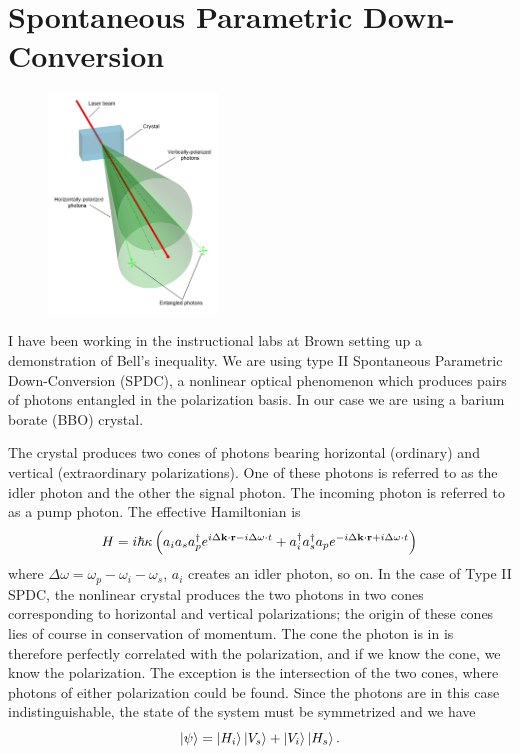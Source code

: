 \documentclass{report}
\begin{document}
\section{Spontaneous Parametric Down-Conversion}
\begin{figure}
	\begin{center}
		\includegraphics[width=0.4\textwidth]{figs/september/350px-SPDC_figure.png}
		\caption{}
		\label{fig:spdc}
	\end{center}
	\vspace*{-4em}
\end{figure}

I have been working in the instructional labs at Brown setting up a demonstration 
of Bell's inequality. We are using type II Spontaneous Parametric
Down-Conversion (SPDC), a nonlinear optical phenomenon which produces pairs of photons
entangled in the polarization basis. In our case we are using a barium borate
(BBO) crystal. 

The crystal produces two cones of photons bearing horizontal (ordinary) and 
vertical (extraordinary polarizations). One of these photons is referred to as 
the idler photon and the other the signal photon. The incoming photon is 
referred to as a pump photon. The effective Hamiltonian is 
\begin{equation*}
	H = i\hbar \kappa 
		\left(
			a_i a_s a_p^\dagger e^{i\Delta \vb{k}\cdot \vb{r} - i\Delta \omega \cdot t}
			+ a_i^\dagger a_s^\dagger a_p 
				e^{-i\Delta \vb{k}\cdot \vb{r} + i\Delta \omega \cdot t}
		\right)
\end{equation*}
where $ \Delta \omega = \omega_p - \omega_i - \omega_s $, $ a_i $ creates an
idler photon, so on. In the case of Type II SPDC, the nonlinear crystal produces
the two photons in two cones corresponding to horizontal and vertical
polarizations; the origin of these cones lies of course in conservation of
momentum. The cone the photon is in is therefore perfectly correlated with the
polarization, and if we know the cone, we know the polarization. 
The exception is the intersection of the two cones, where photons of either
polarization could be found. Since the photons are in this case
indistinguishable, the state 
of the system must be symmetrized and we have 
\begin{equation*}
	\ket{\psi} = \ket{H_i}\ket{V_s} + \ket{V_i}\ket{H_s}.
\end{equation*}
\end{document}
